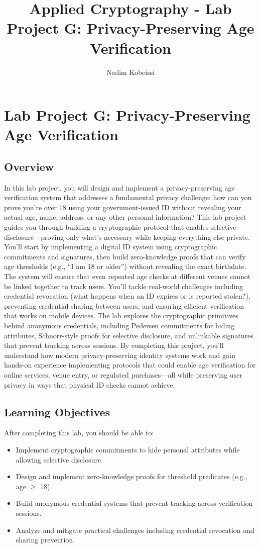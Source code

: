\documentclass[10pt,a4paper,american]{exam}
\title{Applied Cryptography - Lab Project G: Privacy-Preserving Age Verification}
\author{Nadim Kobeissi}
\begin{document}
\classhandoutheader
\section*{Lab Project G: Privacy-Preserving Age Verification}

\subsection*{Overview}
In this lab project, you will design and implement a privacy-preserving age verification system that addresses a fundamental privacy challenge: how can you prove you're over 18 using your government-issued ID without revealing your actual age, name, address, or any other personal information? This lab project guides you through building a cryptographic protocol that enables selective disclosure—proving only what's necessary while keeping everything else private. You'll start by implementing a digital ID system using cryptographic commitments and signatures, then build zero-knowledge proofs that can verify age thresholds (e.g., ``I am 18 or older'') without revealing the exact birthdate. The system will ensure that even repeated age checks at different venues cannot be linked together to track users. You'll tackle real-world challenges including credential revocation (what happens when an ID expires or is reported stolen?), preventing credential sharing between users, and ensuring efficient verification that works on mobile devices. The lab explores the cryptographic primitives behind anonymous credentials, including Pedersen commitments for hiding attributes, Schnorr-style proofs for selective disclosure, and unlinkable signatures that prevent tracking across sessions. By completing this project, you'll understand how modern privacy-preserving identity systems work and gain hands-on experience implementing protocols that could enable age verification for online services, venue entry, or regulated purchases—all while preserving user privacy in ways that physical ID checks cannot achieve.

\subsection*{Learning Objectives}
After completing this lab, you should be able to:
\begin{itemize}
	\item Implement cryptographic commitments to hide personal attributes while allowing selective disclosure.
	\item Design and implement zero-knowledge proofs for threshold predicates (e.g., age $\geq$ 18).
	\item Build anonymous credential systems that prevent tracking across verification sessions.
	\item Analyze and mitigate practical challenges including credential revocation and sharing prevention.
\end{itemize}
\end{document}
